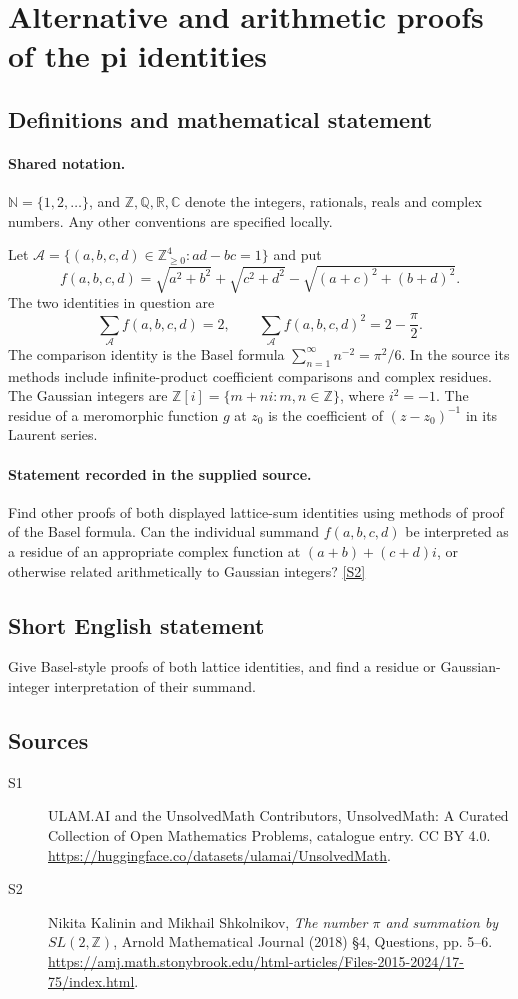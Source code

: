 \documentclass[11pt]{article}
\newcommand{\sref}[2]{\hyperlink{source:#1:#2}{[S#2]}}
\begin{document}
\section{Alternative and arithmetic proofs of the pi identities}\label{statement}

\subsection{Definitions and mathematical statement}

\paragraph{Shared notation.}$\mathbb N=\{1,2,\ldots\}$, and $\mathbb Z,\mathbb Q,\mathbb R,\mathbb C$ denote the integers, rationals, reals and complex numbers. Any other conventions are specified locally.


Let $\mathcal A=\{(a,b,c,d)\in\mathbb Z_{\ge0}^{4}:ad-bc=1\}$ and put
\[
f(a,b,c,d)=\sqrt{a^2+b^2}+\sqrt{c^2+d^2}-\sqrt{(a+c)^2+(b+d)^2}.
\]
The two identities in question are
\[
\sum_{\mathcal A}f(a,b,c,d)=2,\qquad
\sum_{\mathcal A}f(a,b,c,d)^2=2-\frac\pi2.
\]
The comparison identity is the Basel formula $\sum_{n=1}^{\infty}n^{-2}=\pi^2/6$. In the source its methods include infinite-product coefficient comparisons and complex residues. The Gaussian integers are $\mathbb Z[i]=\{m+ni:m,n\in\mathbb Z\}$, where $i^2=-1$. The residue of a meromorphic function $g$ at $z_0$ is the coefficient of $(z-z_0)^{-1}$ in its Laurent series.
\paragraph{Statement recorded in the supplied source.}
Find other proofs of both displayed lattice-sum identities using methods of proof of the Basel formula. Can the individual summand $f(a,b,c,d)$ be interpreted as a residue of an appropriate complex function at $(a+b)+(c+d)i$, or otherwise related arithmetically to Gaussian integers? \sref{statement}{2}
\subsection{Short English statement}
Give Basel-style proofs of both lattice identities, and find a residue or Gaussian-integer interpretation of their summand.
\subsection{Sources}
\begin{description}
\item[\hypertarget{source:statement:1}{S1}] ULAM.AI and the UnsolvedMath Contributors, UnsolvedMath: A Curated Collection of Open Mathematics Problems, catalogue entry. CC BY 4.0. \url{https://huggingface.co/datasets/ulamai/UnsolvedMath}.
\item[\hypertarget{source:statement:2}{S2}] Nikita Kalinin and Mikhail Shkolnikov, \emph{The number $\pi$ and summation by $SL(2,\mathbb Z)$}, Arnold Mathematical Journal (2018) \S4, Questions, pp. 5--6. \url{https://amj.math.stonybrook.edu/html-articles/Files-2015-2024/17-75/index.html}.
\end{description}
\label{end:statement}
\end{document}
